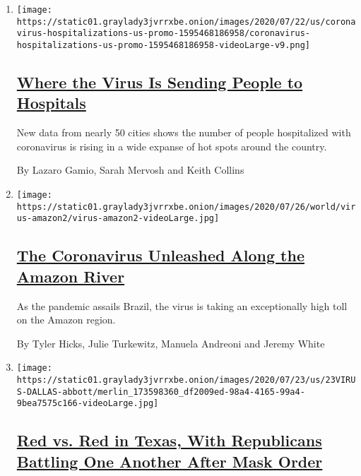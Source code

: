 \begin{enumerate}
\def\labelenumi{\arabic{enumi}.}
\item
  \texttt{[image: https://static01.graylady3jvrrxbe.onion/images/2020/07/22/us/coronavirus-hospitalizations-us-promo-1595468186958/coronavirus-hospitalizations-us-promo-1595468186958-videoLarge-v9.png]}

  \hypertarget{where-the-virus-is-sending-people-to-hospitals}{%
  \subsection{\texorpdfstring{\href{/interactive/2020/07/23/us/coronavirus-hospitalizations-us.html}{Where
  the Virus Is Sending People to
  Hospitals}}{Where the Virus Is Sending People to Hospitals}}\label{where-the-virus-is-sending-people-to-hospitals}}

  New data from nearly 50 cities shows the number of people hospitalized
  with coronavirus is rising in a wide expanse of hot spots around the
  country.

  By Lazaro Gamio, Sarah Mervosh and Keith Collins
\item
  \texttt{[image: https://static01.graylady3jvrrxbe.onion/images/2020/07/26/world/virus-amazon2/virus-amazon2-videoLarge.jpg]}

  \hypertarget{the-coronavirus-unleashed-along-the-amazon-river-1}{%
  \subsection{\texorpdfstring{\href{/interactive/2020/07/25/world/americas/coronavirus-brazil-amazon.html}{The
  Coronavirus Unleashed Along the Amazon
  River}}{The Coronavirus Unleashed Along the Amazon River}}\label{the-coronavirus-unleashed-along-the-amazon-river-1}}

  As the pandemic assails Brazil, the virus is taking an exceptionally
  high toll on the Amazon region.

  By Tyler Hicks, Julie Turkewitz, Manuela Andreoni and Jeremy White
\item
  \texttt{[image: https://static01.graylady3jvrrxbe.onion/images/2020/07/23/us/23VIRUS-DALLAS-abbott/merlin\_173598360\_df2009ed-98a4-4165-99a4-9bea7575c166-videoLarge.jpg]}

  \hypertarget{red-vs-red-in-texas-with-republicans-battling-one-another-after-mask-order}{%
  \subsection{\texorpdfstring{\href{/2020/07/23/us/coronavirus-texas-abbott-republicans.html}{Red
  vs. Red in Texas, With Republicans Battling One Another After Mask
  Order}}{Red vs. Red in Texas, With Republicans Battling One Another After Mask Order}}\label{red-vs-red-in-texas-with-republicans-battling-one-another-after-mask-order}}


\end{enumerate}
